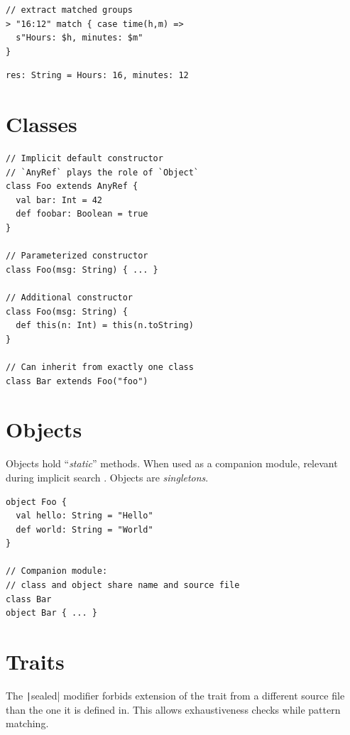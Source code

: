 \documentclass[10pt,landscape,a4paper]{article}
\begin{document}
\begin{multicols*}{4}
\begin{verbatim}
// extract matched groups
> "16:12" match { case time(h,m) =>
  s"Hours: $h, minutes: $m"
}
\end{verbatim}
\begin{verbatim}
res: String = Hours: 16, minutes: 12
\end{verbatim}


  \section{Classes}

\begin{verbatim}
// Implicit default constructor
// `AnyRef` plays the role of `Object`
class Foo extends AnyRef {
  val bar: Int = 42
  def foobar: Boolean = true
}

// Parameterized constructor
class Foo(msg: String) { ... }

// Additional constructor
class Foo(msg: String) {
  def this(n: Int) = this(n.toString)
}

// Can inherit from exactly one class
class Bar extends Foo("foo")
\end{verbatim}

  \section{Objects}

  \begin{mdframed}
    \footnotesize Objects hold ``\textit{static}'' methods.  When used
    as a companion module, relevant during implicit search .  Objects
    are \textit{singletons}.
  \end{mdframed}

\begin{verbatim}
object Foo {
  val hello: String = "Hello"
  def world: String = "World"
}

// Companion module:
// class and object share name and source file
class Bar
object Bar { ... }
\end{verbatim}

  \section{Traits}

  \begin{mdframed}
    \footnotesize
    The \texttt|sealed| modifier forbids extension of the
    trait from a different source file than the one it is defined in.
    This allows exhaustiveness checks while pattern matching.
  \end{mdframed}


\end{multicols*}
\end{document}
